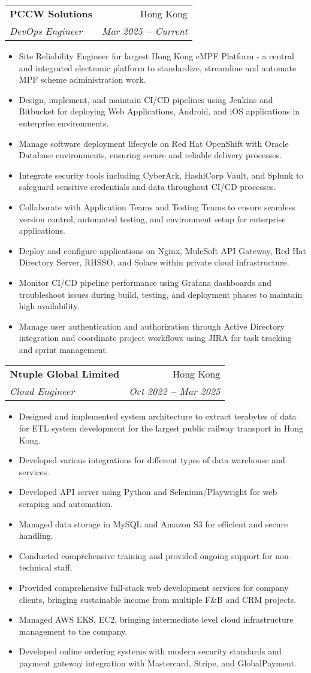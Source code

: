 \documentclass[letterpaper,11pt]{article}
\makeatletter
\newcommand{\resumeItem}[1]{
  \item\small{
    {#1 \vspace{-2pt}}
  }
}
\newcommand{\resumeSubheading}[4]{
  \vspace{-2pt}\item
    \begin{tabular*}{0.97\textwidth}[t]{l@{\extracolsep{\fill}}r}
      \textbf{#1} & #2 \\
      \textit{\small#3} & \textit{\small #4} \\
    \end{tabular*}\vspace{-7pt}
}
\newcommand{\resumeItemListStart}{\begin{itemize}}
\newcommand{\resumeItemListEnd}{\end{itemize}\vspace{-5pt}}
\makeatother
\begin{document}
    \resumeSubheading
      {PCCW Solutions}{Hong Kong}
      {DevOps Engineer}{Mar 2025 \textbf{--} Current}
        \resumeItemListStart
            \resumeItem{Site Reliability Engineer for largest Hong Kong eMPF Platform - a central and integrated electronic platform to standardize, streamline and automate MPF scheme administration work.}
            \resumeItem{Design, implement, and maintain CI/CD pipelines using Jenkins and Bitbucket for deploying Web Applications, Android, and iOS applications in enterprise environments.}
            \resumeItem{Manage software deployment lifecycle on Red Hat OpenShift with Oracle Database environments, ensuring secure and reliable delivery processes.}
            \resumeItem{Integrate security tools including CyberArk, HashiCorp Vault, and Splunk to safeguard sensitive credentials and data throughout CI/CD processes.}
            \resumeItem{Collaborate with Application Teams and Testing Teams to ensure seamless version control, automated testing, and environment setup for enterprise applications.}
            \resumeItem{Deploy and configure applications on Nginx, MuleSoft API Gateway, Red Hat Directory Server, RHSSO, and Solace within private cloud infrastructure.}
            \resumeItem{Monitor CI/CD pipeline performance using Grafana dashboards and troubleshoot issues during build, testing, and deployment phases to maintain high availability.}
            \resumeItem{Manage user authentication and authorization through Active Directory integration and coordinate project workflows using JIRA for task tracking and sprint management.}
        \resumeItemListEnd

    \resumeSubheading
      {Ntuple Global Limited}{Hong Kong}
      {Cloud Engineer}{Oct 2022 \textbf{--} Mar 2025}
        \resumeItemListStart
            \resumeItem{Designed and implemented system architecture to extract terabytes of data for ETL system development for the largest public railway transport in Hong Kong.}
            \resumeItem{Developed various integrations for different types of data warehouse and services.}
            \resumeItem{Developed API server using Python and Selenium/Playwright for web scraping and automation.}
            \resumeItem{Managed data storage in MySQL and Amazon S3 for efficient and secure handling.}
            \resumeItem{Conducted comprehensive training and provided ongoing support for non-technical staff.}
            \resumeItem{Provided comprehensive full-stack web development services for company clients, bringing sustainable income from multiple F\&B and CRM projects.}
            \resumeItem{Managed AWS EKS, EC2, bringing intermediate level cloud infrastructure management to the company.}
            \resumeItem{Developed online ordering systems with modern security standards and payment gateway integration with Mastercard, Stripe, and GlobalPayment.}
        \resumeItemListEnd
\end{document}

